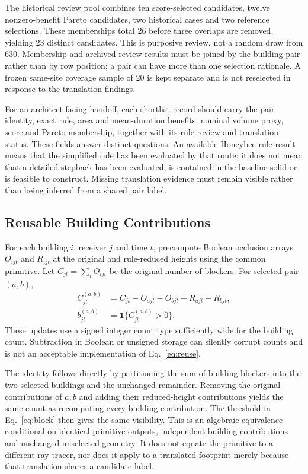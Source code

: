 \documentclass{llncs}
\newcommand{\ind}{\mathbf{1}}
\begin{document}
The historical review pool combines ten score-selected candidates, twelve nonzero-benefit Pareto candidates, two historical cases and two reference selections. These memberships total 26 before three overlaps are removed, yielding 23 distinct candidates. This is purposive review, not a random draw from 630. Membership and archived review results must be joined by the building pair rather than by row position; a pair can have more than one selection rationale. A frozen same-site coverage sample of 20 is kept separate and is not reselected in response to the translation findings.

For an architect-facing handoff, each shortlist record should carry the pair identity, exact rule, area and mean-duration benefits, nominal volume proxy, score and Pareto membership, together with its rule-review and translation status. These fields answer distinct questions. An available Honeybee rule result means that the simplified rule has been evaluated by that route; it does not mean that a detailed stepback has been evaluated, is contained in the baseline solid or is feasible to construct. Missing translation evidence must remain visible rather than being inferred from a shared pair label.

\subsection{Reusable Building Contributions}

For each building $i$, receiver $j$ and time $t$, precompute Boolean occlusion arrays $O_{ijt}$ and $R_{ijt}$ at the original and rule-reduced heights using the common primitive. Let $C_{jt}=\sum_i O_{ijt}$ be the original number of blockers. For selected pair $(a,b)$,
\begin{align}
 C_{jt}^{(a,b)}&=C_{jt}-O_{ajt}-O_{bjt}+R_{ajt}+R_{bjt},\label{eq:reuse}\\
 b_{jt}^{(a,b)}&=\ind\{C_{jt}^{(a,b)}>0\}.\label{eq:block}
\end{align}
These updates use a signed integer count type sufficiently wide for the building count. Subtraction in Boolean or unsigned storage can silently corrupt counts and is not an acceptable implementation of Eq.~\ref{eq:reuse}.

The identity follows directly by partitioning the sum of building blockers into the two selected buildings and the unchanged remainder. Removing the original contributions of $a,b$ and adding their reduced-height contributions yields the same count as recomputing every building contribution. The threshold in Eq.~\ref{eq:block} then gives the same visibility. This is an algebraic equivalence conditional on identical primitive outputs, independent building contributions and unchanged unselected geometry. It does not equate the primitive to a different ray tracer, nor does it apply to a translated footprint merely because that translation shares a candidate label.
\end{document}
